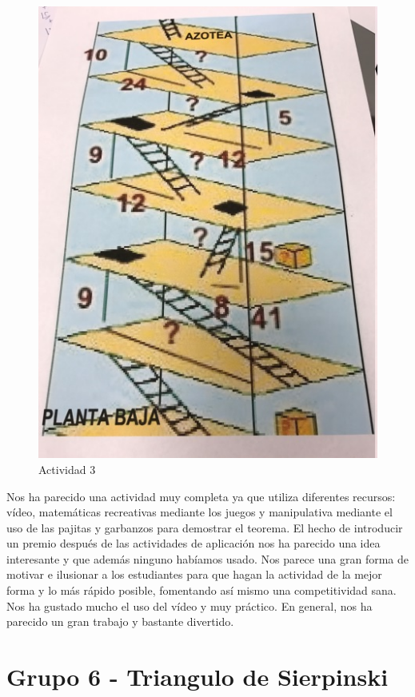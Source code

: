\begin{itemize}
\begin{figure}[hbtp]
\centering
\includegraphics{img/grupo5_3.jpg}
\caption{Actividad 3}
\end{figure}

\end{itemize}

Nos ha parecido una actividad muy completa ya que utiliza diferentes recursos: vídeo, matemáticas recreativas mediante los juegos y manipulativa mediante el uso de las pajitas y garbanzos para demostrar el teorema. El hecho de introducir un premio después de las actividades de aplicación nos ha parecido una idea interesante y que además ninguno habíamos usado. Nos parece una gran forma de motivar e ilusionar a los estudiantes para que hagan la actividad de la mejor forma y lo más rápido posible, fomentando así mismo una competitividad sana. Nos ha gustado mucho el uso del vídeo y muy práctico. En general, nos ha parecido un gran trabajo y bastante divertido.


\newpage
\section*{Grupo 6 - Triangulo de Sierpinski}

